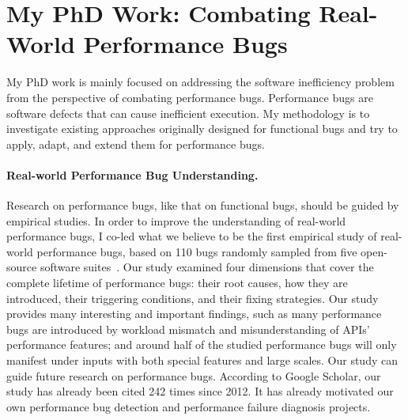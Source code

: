 \documentclass[10pt]{article}
\begin{document}
\vspace{-.1in}
\section{My PhD Work: Combating Real-World Performance Bugs}

My PhD work is mainly focused on addressing the software 
inefficiency problem from the perspective of combating performance bugs. 
Performance bugs are software defects that can cause inefficient execution. 
My methodology is to investigate existing approaches originally designed for functional bugs
and try to apply, adapt, and extend them for performance bugs. 


\vspace{-.1in}
\paragraph{Real-world Performance Bug Understanding.}
Research on performance bugs, like that on functional bugs, 
should be guided by empirical studies. 
In order to improve the understanding of real-world performance bugs, 
I co-led what we believe to be the first 
empirical study of real-world performance bugs, 
based on 110 bugs randomly sampled from five open-source software suites~\cite{jin12perfbug}. 
Our study examined four dimensions 
that cover the complete lifetime of performance bugs:
their root causes, 
how they are introduced, their triggering conditions, and their fixing strategies. 
Our study provides many interesting and important findings, 
such as many performance bugs are introduced by workload mismatch 
and misunderstanding of APIs' performance features; 
and around half of the studied performance bugs 
will only manifest under inputs with both special features and large scales. 
Our study can guide future research on performance bugs.
According to Google Scholar, our study has already been cited 
242 times since 2012. 
It has already motivated our own performance bug detection 
and performance failure diagnosis projects.



\vspace{-.1in}
\end{document}

